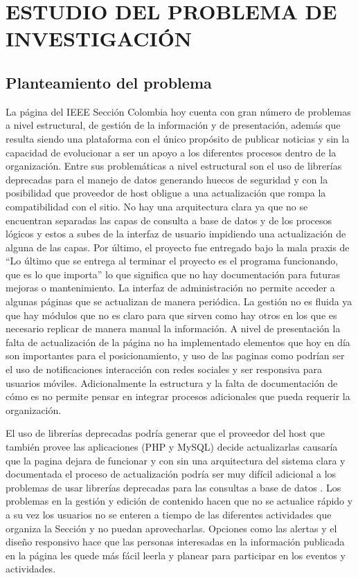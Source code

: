 \section{ESTUDIO DEL PROBLEMA DE INVESTIGACIÓN}

\subsection[short title]{Planteamiento del problema}

La página del IEEE Sección Colombia hoy cuenta con gran número de problemas a nivel estructural, de gestión de la información y de presentación, además que resulta siendo una plataforma con el único propósito de publicar noticias y sin la capacidad de evolucionar a ser un apoyo a los diferentes procesos dentro de la organización. Entre sus problemáticas a nivel estructural son el uso de librerías deprecadas para el manejo de datos generando huecos de seguridad y con la posibilidad que proveedor de host obligue a una actualización que rompa la compatibilidad con el sitio. No hay una arquitectura clara ya que no se encuentran separadas las capas de consulta a base de datos y de los procesos lógicos y estos a subes de la interfaz de usuario impidiendo una actualización de alguna de las capas. Por último, el proyecto fue entregado bajo la mala praxis de “Lo último que se entrega al terminar el proyecto es el programa funcionando, que es lo que importa” lo que significa que no hay documentación para futuras mejoras o mantenimiento. La interfaz de administración no permite acceder a algunas páginas que se actualizan de manera periódica. La gestión no es fluida ya que hay módulos que no es claro para que sirven como hay otros en los que es necesario replicar de manera manual la información. A nivel de presentación la falta de actualización de la página no ha implementado elementos que hoy en día son importantes para el posicionamiento, y uso de las paginas como podrían ser el uso de notificaciones interacción con redes sociales y ser responsiva para usuarios móviles. Adicionalmente la estructura y la falta de documentación de cómo es no permite pensar en integrar procesos adicionales que pueda requerir la organización.


El uso de librerías deprecadas podría generar que el proveedor del host que también provee las aplicaciones (PHP y MySQL) decide actualizarlas causaría que la pagina dejara de funcionar y con sin una arquitectura del sistema clara y documentada el proceso de actualización podría ser muy difícil adicional a los problemas de usar librerías deprecadas para las consultas a base de datos . Los problemas en la gestión y edición de contenido hacen que no se actualice rápido y a su vez los usuarios no se enteren a tiempo de las diferentes actividades que organiza la Sección y no puedan aprovecharlas. Opciones como las alertas y el diseño responsivo hace que las personas interesadas en la información publicada en la página les quede más fácil leerla y planear para participar en los eventos y actividades.


